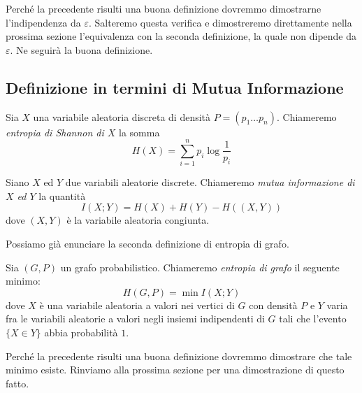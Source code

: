 Perché la precedente risulti una buona definizione dovremmo dimostrarne l'indipendenza da \(\varepsilon\). Salteremo questa verifica e dimostreremo direttamente nella prossima sezione l'equivalenza con la seconda definizione, la quale non dipende da \(\varepsilon\). Ne seguirà la buona definizione.

\subsection{Definizione in termini di Mutua Informazione} 
\begin{definition}
	Sia \(X\) una variabile aleatoria discreta di densità \(P=(p_1\dots p_n)\). Chiameremo \emph{entropia di Shannon di \(X\)} la somma
	\[H(X)=\sum_{i=1}^n p_i \log{\frac{1}{p_i}}\]
\end{definition}
\begin{definition}
	Siano \(X\) ed \(Y\) due variabili aleatorie discrete. Chiameremo \emph{mutua informazione di \(X\) ed \(Y\)} la quantità
	\[I(X;Y)=H(X)+H(Y)-H((X,Y))\]
	dove \((X,Y)\) è la variabile aleatoria congiunta. 
\end{definition}

Possiamo già enunciare la seconda definizione di entropia di grafo. 
\begin{definition}
	Sia \((G,P)\) un grafo probabilistico. Chiameremo \emph{entropia di grafo} il seguente minimo: 
	\begin{equation}
		\label{eq:entropytwo} H(G,P)=\min I(X;Y) 
	\end{equation}
	dove \(X\) è una variabile aleatoria a valori nei vertici di \(G\) con densità \(P\) e \(Y\) varia fra le variabili aleatorie a valori negli insiemi indipendenti di \(G\) tali che l'evento \(\{X\in Y\}\) abbia probabilità \(1\). 
\end{definition}

Perché la precedente risulti una buona definizione dovremmo dimostrare che tale minimo esiste. Rinviamo alla prossima sezione per una dimostrazione di questo fatto.


